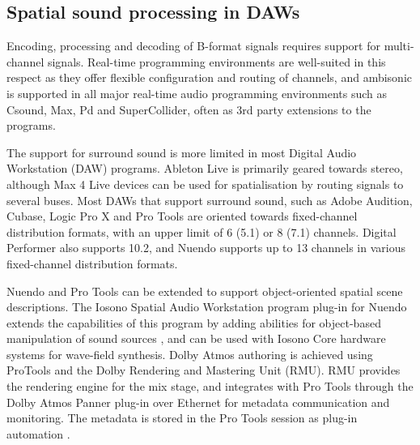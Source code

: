 \documentclass{article}
\begin{document}
\subsection{Spatial sound processing in DAWs}

Encoding, processing and decoding of B-format signals requires support for multi-channel signals.
Real-time programming environments are well-suited in this respect as they offer flexible configuration and routing of channels, and ambisonic is supported in all major real-time audio programming environments such as Csound, Max, Pd and SuperCollider, often as 3rd party extensions to the programs.

The support for surround sound is more limited in most Digital Audio Workstation (DAW) programs.
Ableton Live is primarily geared towards stereo, although Max 4 Live devices can be used for spatialisation by routing signals to several buses.
Most DAWs that support surround sound, such as Adobe Audition, Cubase, Logic Pro X and Pro Tools are oriented towards fixed-channel distribution formats, with an upper limit of 6 (5.1) or 8 (7.1) channels.
Digital Performer also supports 10.2, and Nuendo supports up to 13 channels in various fixed-channel distribution formats.

Nuendo and Pro Tools can be extended to support object-oriented spatial scene descriptions.
The Iosono Spatial Audio Workstation program plug-in for Nuendo extends the capabilities of this program by adding abilities for object-based manipulation of sound sources \cite{iosono2012:workstation}, and can be used with Iosono Core hardware systems for wave-field synthesis.
Dolby Atmos authoring is achieved using ProTools and the Dolby Rendering and Mastering Unit (RMU).
RMU provides the rendering engine for the mix stage, and integrates with Pro Tools through the Dolby Atmos Panner plug-in over Ethernet for metadata communication and monitoring. 
The metadata is stored in the Pro Tools session as plug-in automation \cite{dolby:2013authoring}.
\end{document}
